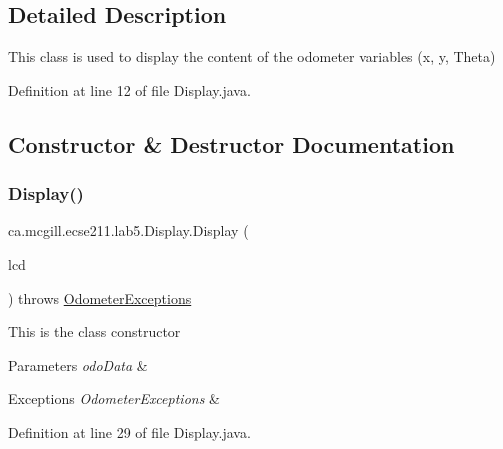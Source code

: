 \subsection{Detailed Description}
This class is used to display the content of the odometer variables (x, y, Theta) 

Definition at line 12 of file Display.\+java.



\subsection{Constructor \& Destructor Documentation}
\mbox{\label{classca_1_1mcgill_1_1ecse211_1_1lab5_1_1_display_aeb15906f02c60c1ca449d4c37922739b}} 
\subsubsection{\texorpdfstring{Display()}{Display()}\hspace{0.1cm}{\footnotesize\ttfamily [1/2]}}
{\footnotesize\ttfamily ca.\+mcgill.\+ecse211.\+lab5.\+Display.\+Display (\begin{DoxyParamCaption}\item[{Text\+L\+CD}]{lcd }\end{DoxyParamCaption}) throws \hyperlink{classca_1_1mcgill_1_1ecse211_1_1odometer_1_1_odometer_exceptions}{Odometer\+Exceptions}}

This is the class constructor


\begin{DoxyParams}{Parameters}
{\em odo\+Data} & \\
\hline
\end{DoxyParams}

\begin{DoxyExceptions}{Exceptions}
{\em Odometer\+Exceptions} & \\
\hline
\end{DoxyExceptions}


Definition at line 29 of file Display.\+java.

